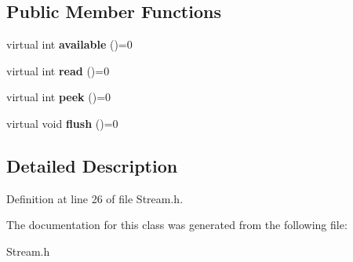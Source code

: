 \subsection*{\-Public \-Member \-Functions}
\begin{DoxyCompactItemize}
\item 
\hypertarget{classStream_a9c98a763395005c08ce95afb2f06c7b1}{
virtual int {\bfseries available} ()=0}
\label{classStream_a9c98a763395005c08ce95afb2f06c7b1}

\item 
\hypertarget{classStream_aea5dee9fcb038148515b7c9212d38dc0}{
virtual int {\bfseries read} ()=0}
\label{classStream_aea5dee9fcb038148515b7c9212d38dc0}

\item 
\hypertarget{classStream_a30c3c212ec6ea67277a708c5ea2501a5}{
virtual int {\bfseries peek} ()=0}
\label{classStream_a30c3c212ec6ea67277a708c5ea2501a5}

\item 
\hypertarget{classStream_aa3ef2c34f152a0b2ea8de9139b9461da}{
virtual void {\bfseries flush} ()=0}
\label{classStream_aa3ef2c34f152a0b2ea8de9139b9461da}

\end{DoxyCompactItemize}


\subsection{\-Detailed \-Description}


\-Definition at line 26 of file \-Stream.\-h.



\-The documentation for this class was generated from the following file\-:\begin{DoxyCompactItemize}
\item 
\-Stream.\-h\end{DoxyCompactItemize}
